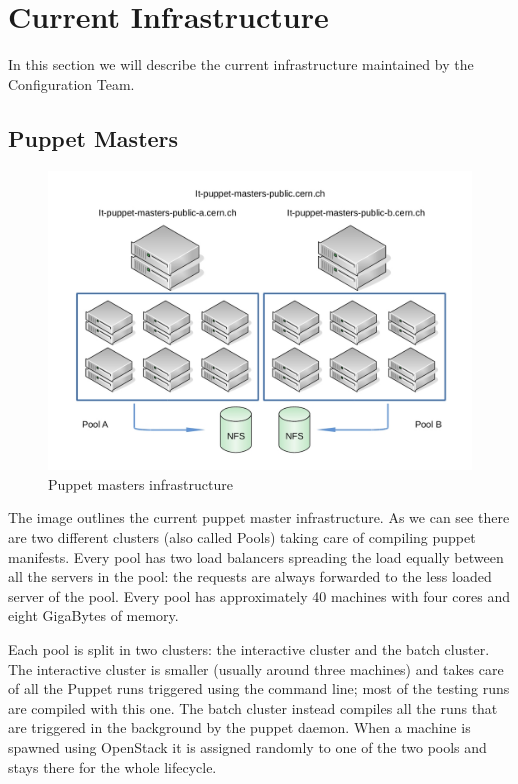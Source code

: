 \section{Current Infrastructure}

In this section we will describe the current infrastructure maintained by
the Configuration Team.

\subsection{Puppet Masters}


\begin{figure}[H]
\includegraphics[width=\textwidth,height=\textheight,keepaspectratio]{ConfigurationManagement/Infrastructure_pm.jpg}
\caption{Puppet masters infrastructure}
\end{figure}

The image outlines the current puppet master infrastructure. As we can see
there are two different clusters (also called Pools) taking care of
compiling puppet manifests. Every pool has two load balancers spreading
the load equally between all the servers in the pool: the requests are
always forwarded to the less loaded server of the pool. Every pool has
approximately 40 machines with four cores and eight GigaBytes of memory.

Each pool is split in two clusters: the interactive cluster and the batch
cluster. The interactive cluster is smaller (usually around three
machines) and takes care of all the Puppet runs triggered using the
command line; most of the testing runs are compiled with this one. The
batch cluster instead compiles all the runs that are triggered in the
background by the puppet daemon. When a machine is spawned using OpenStack
it is assigned randomly to one of the two pools and stays there for the
whole lifecycle.

